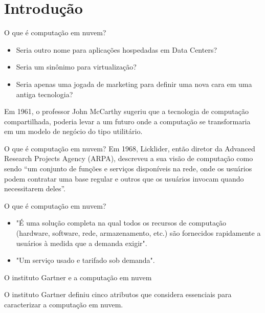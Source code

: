 \documentclass{beamer}
\begin{document}
\section{Introdução}
\begin{frame}[fragile]{O que é computação em nuvem?}\justifying
      \begin{itemize}
            \item Seria outro nome para aplicações hospedadas em Data Centers?
            \item Seria um sinônimo para virtualização?
            \item Seria apenas uma jogada de marketing para definir uma nova cara em uma antiga tecnologia?
      \end{itemize}
      Em 1961, o professor John McCarthy sugeriu que a tecnologia de computação compartilhada, poderia levar a um futuro onde a computação se transformaria em um modelo de negócio do tipo utilitário.
\end{frame}
\begin{frame}[fragile]{O que é computação em nuvem?}\justifying
      Em 1968, Licklider, então diretor da Advanced Research Projects Agency (ARPA), descreveu a sua visão de computação como sendo “um conjunto de funções e serviços disponíveis na rede, onde os usuários podem contratar uma base regular e outros que os usuários invocam quando necessitarem deles”.
\end{frame}
\begin{frame}[fragile]{O que é computação em nuvem?}\justifying
      \begin{itemize}
            \item "É uma solução completa na qual todos os recursos de computação (hardware, software, rede, armazenamento, etc.) são fornecidos rapidamente a usuários à medida que a demanda exigir".
            \item "Um serviço usado e tarifado sob demanda".
      \end{itemize}
\end{frame}


\begin{frame}[fragile]{O instituto Gartner e a computação em nuvem}\justifying
      \begin{center}
            \Large{O instituto Gartner definiu cinco atributos que considera essenciais para caracterizar a computação em nuvem.}
      \end{center}
\end{frame}
\end{document}
